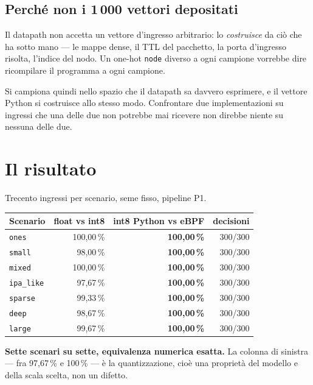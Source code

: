 \documentclass[11pt,a4paper,oneside]{report}
\begin{document}
\subsection*{Perché non i 1\,000 vettori depositati}

Il datapath non accetta un vettore d'ingresso arbitrario: lo \emph{costruisce}
da ciò che ha sotto mano --- le mappe dense, il TTL del pacchetto, la porta
d'ingresso risolta, l'indice del nodo. Un one-hot \texttt{node} diverso a ogni
campione vorrebbe dire ricompilare il programma a ogni campione.

Si campiona quindi nello spazio che il datapath sa davvero esprimere, e il
vettore Python si costruisce allo stesso modo. Confrontare due implementazioni
su ingressi che una delle due non potrebbe mai ricevere non direbbe niente su
nessuna delle due.

\section{Il risultato}

Trecento ingressi per scenario, seme fisso, pipeline P1.

\begin{center}
\small
\begin{tabular}{@{}lrrr@{}}
\toprule
\textbf{Scenario} & \textbf{float vs int8} &
\textbf{int8 Python vs eBPF} & \textbf{decisioni} \\
\midrule
\texttt{ones}      & 100,00\,\% & \textbf{100,00\,\%} & 300/300 \\
\texttt{small}     &  98,00\,\% & \textbf{100,00\,\%} & 300/300 \\
\texttt{mixed}     & 100,00\,\% & \textbf{100,00\,\%} & 300/300 \\
\texttt{ipa\_like} &  97,67\,\% & \textbf{100,00\,\%} & 300/300 \\
\texttt{sparse}    &  99,33\,\% & \textbf{100,00\,\%} & 300/300 \\
\texttt{deep}      &  98,67\,\% & \textbf{100,00\,\%} & 300/300 \\
\texttt{large}     &  99,67\,\% & \textbf{100,00\,\%} & 300/300 \\
\bottomrule
\end{tabular}
\end{center}

\textbf{Sette scenari su sette, equivalenza numerica esatta.} La colonna di
sinistra --- fra 97,67\,\% e 100\,\% --- è la quantizzazione, cioè una
proprietà del modello e della scala scelta, non un difetto.
\end{document}
